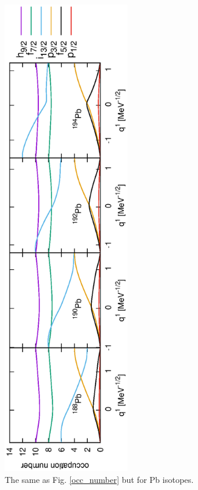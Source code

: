 \documentclass[%
superscriptaddress,
showpacs,
nofootinbib,
amsmath,amssymb,
aps,
prc,
twocolumn,
floatfix ]%
{revtex4-1}
\begin{document}
\begin{figure}[tb]
 \begin{center}
  \includegraphics[width=55mm,angle=-90]{Pbocc_number.eps}
 \end{center}
	\caption{The same as Fig. \ref{occ_number} but for Pb isotopes.
}
 \label{Pb_occ_number}
\end{figure}
\end{document}
